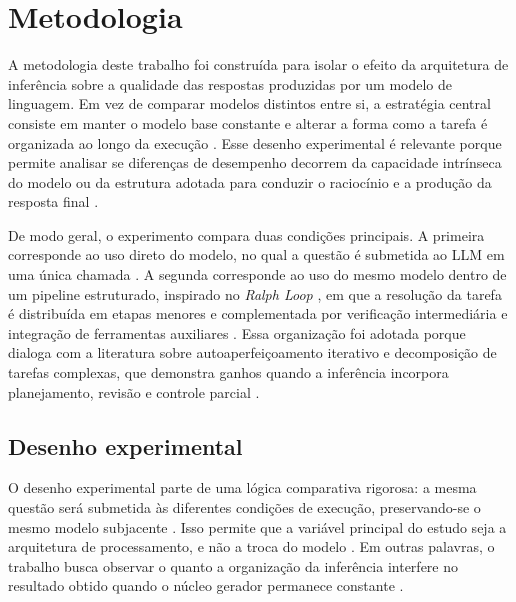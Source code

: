 \documentclass[a4paper,10pt,twocolumn]{article}
\begin{document}
\FloatBarrier

\section{Metodologia}

A metodologia deste trabalho foi construída para isolar o efeito da arquitetura de inferência sobre a qualidade das respostas produzidas por um modelo de linguagem. Em vez de comparar modelos distintos entre si, a estratégia central consiste em manter o modelo base constante e alterar a forma como a tarefa é organizada ao longo da execução \cite{zhang2024enhancing,liu2025beyond}. Esse desenho experimental é relevante porque permite analisar se diferenças de desempenho decorrem da capacidade intrínseca do modelo ou da estrutura adotada para conduzir o raciocínio e a produção da resposta final \cite{openai2023gpt4,huttula2025advanced}.

De modo geral, o experimento compara duas condições principais. A primeira corresponde ao uso direto do modelo, no qual a questão é submetida ao LLM em uma única chamada \cite{kojima2022large}. A segunda corresponde ao uso do mesmo modelo dentro de um pipeline estruturado, inspirado no \textit{Ralph Loop} \cite{ghuntley2025ralph}, em que a resolução da tarefa é distribuída em etapas menores e complementada por verificação intermediária e integração de ferramentas auxiliares \cite{mcp_multiagent2025,sarkar2025mcp}. Essa organização foi adotada porque dialoga com a literatura sobre autoaperfeiçoamento iterativo e decomposição de tarefas complexas, que demonstra ganhos quando a inferência incorpora planejamento, revisão e controle parcial \cite{shinn2023reflexion,madaan2023selfrefine,wang2023selfconsistency}.

\subsection{Desenho experimental}

O desenho experimental parte de uma lógica comparativa rigorosa: a mesma questão será submetida às diferentes condições de execução, preservando-se o mesmo modelo subjacente \cite{hendrycks2021measuring,rein2023gpqa}. Isso permite que a variável principal do estudo seja a arquitetura de processamento, e não a troca do modelo \cite{zhang2024enhancing}. Em outras palavras, o trabalho busca observar o quanto a organização da inferência interfere no resultado obtido quando o núcleo gerador permanece constante \cite{huttula2025advanced,liu2025beyond}.
\end{document}
